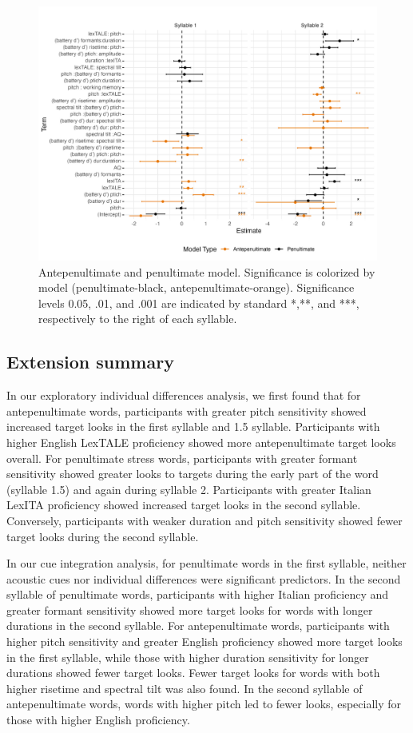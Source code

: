 \begin{figure}[H]
  \centering
  \includegraphics[width=1\linewidth]{visuals/extended_analysis.jpeg} %
  \caption{Antepenultimate and penultimate model. Significance is colorized by model (penultimate-black, antepenultimate-orange). Significance levels 0.05, .01, and .001 are indicated by standard *,**, and ***, respectively to the right of each syllable.}
  \label{fig:extened_analysis}
\end{figure}


\subsection{Extension summary}

In our exploratory individual differences analysis, we first found that for antepenultimate words, participants with greater pitch sensitivity showed increased target looks in the first syllable and 1.5 syllable. Participants with higher English LexTALE proficiency showed more antepenultimate target looks overall. For penultimate stress words, participants with greater formant sensitivity showed greater looks to targets during the early part of the word (syllable 1.5) and again during syllable 2. Participants with greater Italian LexITA proficiency showed increased target looks in the second syllable. Conversely, participants with weaker duration and pitch sensitivity showed fewer target looks during the second syllable. 

In our cue integration analysis, for penultimate words in the first syllable, neither acoustic cues nor individual differences were significant predictors. In the second syllable of penultimate words, participants with higher Italian proficiency and greater formant sensitivity showed more target looks for words with longer durations in the second syllable. For antepenultimate words, participants with higher pitch sensitivity and greater English proficiency showed more target looks in the first syllable, while those with higher duration sensitivity for longer durations showed fewer target looks. Fewer target looks for words with both higher risetime and spectral tilt was also found. In the second syllable of antepenultimate words, words with higher pitch led to fewer looks, especially for those with higher English proficiency. 


